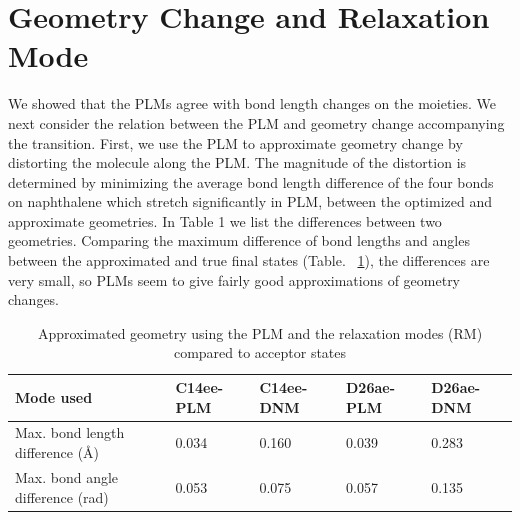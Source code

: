 \section{Geometry Change and Relaxation Mode}

We showed that the PLMs agree with bond length changes on the moieties.   We next
consider the relation between the PLM and geometry change accompanying the transition.
First, we use the PLM to approximate geometry change by distorting the molecule
along the PLM.   The magnitude of the distortion
 is determined  by minimizing the average bond length difference of the four bonds on naphthalene
 which stretch significantly in PLM, between the optimized and approximate geometries. In Table 1 we list the differences between two geometries.
Comparing the maximum difference of bond
lengths and angles between the approximated and true final states (Table. ~\ref{aprroxGeom}), the differences are very small,
so PLMs seem to give fairly good approximations of geometry changes.



\begin{table}[t]
 \caption{Approximated geometry using the PLM and the relaxation modes (RM) compared to acceptor states}
 \label{aprroxGeom}
 \begin{tabular}{lllll}
   \hline
   Mode used & C14ee-PLM   & C14ee-DNM  & D26ae-PLM  & D26ae-DNM\\
   \hline
   Max. bond length difference (\AA)   & 0.034 & 0.160 &0.039 & 0.283   \\
     Max. bond angle difference (rad)   & 0.053 &0.075 & 0.057 &0.135   \\
   \hline
 \end{tabular}
\end{table}


